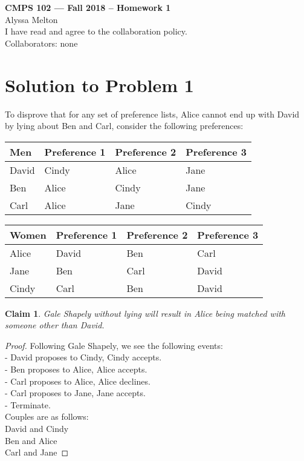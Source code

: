 \documentclass[11pt]{article}
\newtheorem{claim}[theorem]{Claim}
\begin{document}
	
	\begin{center}
		{\bf\Large CMPS 102 --- Fall 2018 --  Homework 1}\\
		Alyssa Melton\\
		I have read and agree to the collaboration policy. \\
		Collaborators: none\\
	\end{center}
	
	
	\section*{Solution to Problem 1}
	
To disprove that for any set of preference lists, Alice cannot end up with David
by lying about Ben and Carl, consider the following preferences:
\vspace{.25cm}

\begin{tabu} to 0.8\textwidth { | X[c] | X[c] | X[c] | X[c] | }
	\hline
	Men & Preference 1 & Preference 2 & Preference 3\\
	\hline
	David & Cindy & Alice & Jane\\
	\hline
	Ben  & Alice  & Cindy & Jane  \\
	\hline
	Carl & Alice & Jane & Cindy\\
	\hline
\end{tabu}

\vspace{.25cm}
\begin{tabu} to 0.8\textwidth { | X[c] | X[c] | X[c] | X[c] | }
	\hline
	Women & Preference 1 & Preference 2 & Preference 3\\
	\hline
	Alice & David & Ben & Carl\\
	\hline
	Jane  & Ben  & Carl & David  \\
	\hline
	Cindy & Carl & Ben & David\\
	\hline
\end{tabu}


	\begin{claim} 
		Gale Shapely without lying will result in Alice being matched with someone other than David.
	\end{claim}
	\begin{proof}
		Following Gale Shapely, we see the following events:\\
		- David proposes to Cindy, Cindy accepts.\\
		- Ben proposes to Alice, Alice accepts.\\
		- Carl proposes to Alice, Alice declines.\\
		- Carl proposes to Jane, Jane accepts.\\
		- Terminate. \\
		Couples are as follows:\\
		David and Cindy\\
		Ben and Alice\\
		Carl and Jane
	\end{proof}
\end{document}
